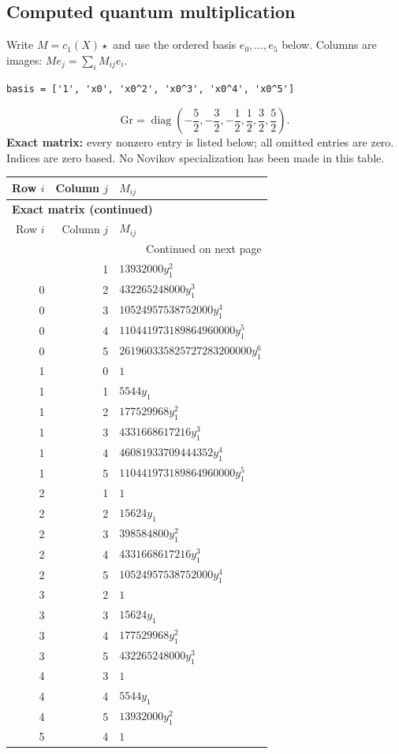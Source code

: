 \documentclass[10pt,a4paper]{article}
\begin{document}
\subsection*{Computed quantum multiplication}
Write $M=c_1(X)\star$ and use the ordered basis $e_0,\ldots,e_{5}$ below. Columns are images: $M e_j=\sum_i M_{ij}e_i$.
\begin{lstlisting}
basis = ['1', 'x0', 'x0^2', 'x0^3', 'x0^4', 'x0^5']
\end{lstlisting}
\[\mathrm{Gr}=\operatorname{diag}\!\left(- \frac{5}{2},- \frac{3}{2},- \frac{1}{2},\frac{1}{2},\frac{3}{2},\frac{5}{2}\right).\]
\textbf{Exact matrix:} every nonzero entry is listed below; all omitted entries are zero. Indices are zero based. No Novikov specialization has been made in this table.
{\small\setlength{\tabcolsep}{7pt}\begin{longtable}{rrp{125mm}}
\toprule Row $i$ & Column $j$ & $M_{ij}$\\\midrule\endfirsthead
\multicolumn{3}{l}{\textbf{Exact matrix (continued)}}\\
\toprule Row $i$ & Column $j$ & $M_{ij}$\\\midrule\endhead
\midrule\multicolumn{3}{r}{Continued on next page}\\\endfoot\bottomrule\endlastfoot
0 & 1 & $13932000 y_{1}^{2}$\\
0 & 2 & $432265248000 y_{1}^{3}$\\
0 & 3 & $10524957538752000 y_{1}^{4}$\\
0 & 4 & $110441973189864960000 y_{1}^{5}$\\
0 & 5 & $261960335825727283200000 y_{1}^{6}$\\
1 & 0 & $1$\\
1 & 1 & $5544 y_{1}$\\
1 & 2 & $177529968 y_{1}^{2}$\\
1 & 3 & $4331668617216 y_{1}^{3}$\\
1 & 4 & $46081933709444352 y_{1}^{4}$\\
1 & 5 & $110441973189864960000 y_{1}^{5}$\\
2 & 1 & $1$\\
2 & 2 & $15624 y_{1}$\\
2 & 3 & $398584800 y_{1}^{2}$\\
2 & 4 & $4331668617216 y_{1}^{3}$\\
2 & 5 & $10524957538752000 y_{1}^{4}$\\
3 & 2 & $1$\\
3 & 3 & $15624 y_{1}$\\
3 & 4 & $177529968 y_{1}^{2}$\\
3 & 5 & $432265248000 y_{1}^{3}$\\
4 & 3 & $1$\\
4 & 4 & $5544 y_{1}$\\
4 & 5 & $13932000 y_{1}^{2}$\\
5 & 4 & $1$\\
\end{longtable}}
\end{document}
